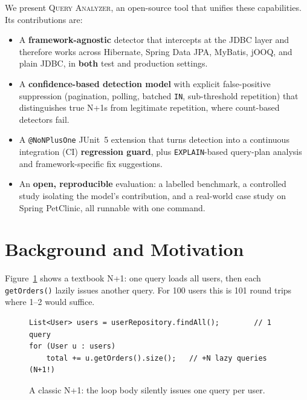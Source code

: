 \documentclass[sigplan,screen]{acmart}
\newcommand{\tool}{\textsc{Query Analyzer}}
\newcommand{\code}[1]{\texttt{\small #1}}
\begin{document}
We present \tool, an open-source tool that unifies these capabilities. Its
contributions are:
\begin{itemize}[leftmargin=*,topsep=2pt,itemsep=1pt]
\item A \textbf{framework-agnostic} detector that intercepts at the JDBC layer
and therefore works across Hibernate, Spring Data JPA, MyBatis, jOOQ, and plain
JDBC, in \textbf{both} test and production settings.
\item A \textbf{confidence-based detection model} with explicit
false-positive suppression (pagination, polling, batched \code{IN},
sub-threshold repetition) that distinguishes true N+1s from legitimate
repetition, where count-based detectors fail.
\item A \code{@NoNPlusOne} JUnit~5 extension that turns detection into a
continuous integration (CI) \textbf{regression guard}, plus
\texttt{EXPLAIN}-based query-plan analysis and
framework-specific fix suggestions.
\item An \textbf{open, reproducible} evaluation: a labelled benchmark, a
controlled study isolating the model's contribution, and a real-world case study
on Spring PetClinic, all runnable with one command.
\end{itemize}

\section{Background and Motivation}
Figure~\ref{fig:motiv} shows a textbook N+1: one query loads all users, then each
\code{getOrders()} lazily issues another query. For 100 users this is 101 round
trips where 1--2 would suffice.

\begin{figure}[t]
\begin{lstlisting}
List<User> users = userRepository.findAll();        // 1 query
for (User u : users)
    total += u.getOrders().size();   // +N lazy queries (N+1!)
\end{lstlisting}
\vspace{-4pt}
\caption{A classic N+1: the loop body silently issues one query per user.}
\label{fig:motiv}
\vspace{-6pt}
\end{figure}
\end{document}
